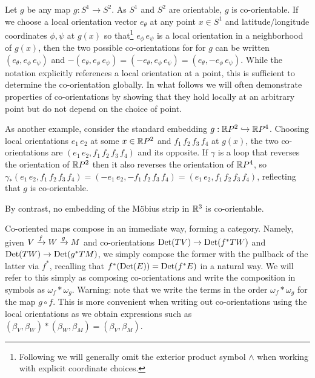 \begin{example}
Let $g$ be any map $g: S^1\to S^2$. As $S^1$ and $S^2$ are orientable, $g$ is co-orientable.  If we choose a local orientation vector $e_{\theta}$ at any point $x\in S^1$ and latitude/longitude coordinates $\phi,\psi$ at $g(x)$ so that\footnote{Following \cite{BoTu82} we will generally omit the exterior product symbol $\wedge$ when working with explicit coordinate choices.} $e_\phi\, e_\psi$ is a local orientation in a neighborhood of $g(x)$, then the two possible co-orientations for for $g$ can be written $(e_\theta, e_\phi\, e_\psi)$ and $-(e_\theta, e_\phi\, e_\psi)=(-e_\theta, e_\phi \,e_\psi)=(e_\theta,- e_\phi\, e_\psi)$. While the notation explicitly references a local orientation at a point, this is sufficient to determine the co-orientation globally. In what follows we will often demonstrate properties of co-orientations by showing that they hold locally at an arbitrary point but do not depend on the choice of point.

As another example, consider the standard embedding $g:\mathbb{R} P^2\hookrightarrow \mathbb{R} P^4$. Choosing local orientations $e_1\,e_2$ at some $x\in \mathbb{R} P^2$ and $f_1\,f_2\,f_3\,f_4$ at $g(x)$, the two co-orientations are
$(e_1\,e_2, f_1\,f_2\,f_3\,f_4)$ and its opposite. If $\gamma$ is a loop  that reverses the orientation of $\mathbb{R} P^2$ then it also reverses the orientation of $\mathbb{R} P^4$, so $\gamma_*(e_1\,e_2, f_1\,f_2\,f_3\,f_4)=(-e_1\,e_2,- f_1\,f_2\,f_3\,f_4)=(e_1\,e_2, f_1\,f_2\,f_3\,f_4)$, reflecting that $g$ is co-orientable.

By contrast, no embedding of the M\"obius strip in $\mathbb{R}^3$ is co-orientable.
\end{example}


\begin{remark}\label{R: cooriented composition}
Co-oriented maps compose in an immediate way, forming a category.
Namely, given $V\xrightarrow{f} W\xrightarrow{g}M$ and co-orientations ${\rm Det}(TV)\to {\rm Det}(f^*TW)$ and ${\rm Det}(TW)\to {\rm Det}(g^*TM)$,  we simply compose the former  with the pullback of the latter via $f^*$, recalling that $f^*({\rm Det}(E))={\rm Det}(f^*E)$ in a natural way. We will refer to this simply as composing co-orientations and write the composition in symbols as $\omega_f*\omega_g$. Warning: note that we write the terms in the order $\omega_f*\omega_g$ for the map $g\circ f$. This is more convenient when writing out co-orientations using the local orientations as we obtain expressions such as $(\beta_V, \beta_W)*(\beta_W,\beta_M)=(\beta_V,\beta_M)$.
\end{remark}

